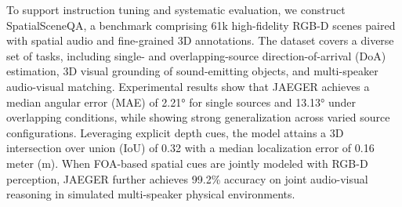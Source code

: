 To support instruction tuning and systematic evaluation, we construct SpatialSceneQA, a benchmark comprising 61k high-fidelity RGB-D scenes paired with spatial audio and fine-grained 3D annotations. The dataset covers a diverse set of tasks, including single- and overlapping-source direction-of-arrival (DoA) estimation, 3D visual grounding of sound-emitting objects, and multi-speaker audio-visual matching. Experimental results show that JAEGER achieves a median angular error (MAE) of 2.21° for single sources and 13.13° under overlapping conditions, while showing strong generalization across varied source configurations. Leveraging explicit depth cues, the model attains a 3D intersection over union (IoU) of 0.32 with a median localization error of 0.16 meter (m). When FOA-based spatial cues are jointly modeled with RGB-D perception, JAEGER further achieves 99.2\% accuracy on joint audio-visual reasoning in simulated multi-speaker physical environments.

